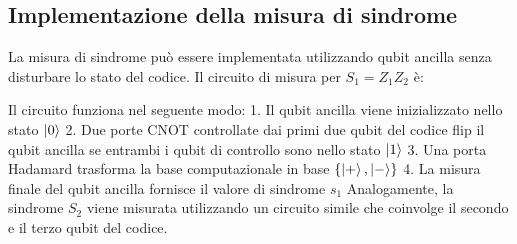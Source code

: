 \documentclass[a4paper,12pt]{report}
\theoremstyle{plain}
\begin{document}
\subsection{Implementazione della misura di sindrome}
La misura di sindrome può essere implementata utilizzando qubit ancilla senza disturbare lo stato del codice. Il circuito di misura per $S_1 = Z_1 Z_2$ è:
\begin{center}
\end{center}
Il circuito funziona nel seguente modo:
1. Il qubit ancilla viene inizializzato nello stato $\ket{0}$
2. Due porte CNOT controllate dai primi due qubit del codice flip il qubit ancilla se entrambi i qubit di controllo sono nello stato $\ket{1}$
3. Una porta Hadamard trasforma la base computazionale in base $\{\ket{+}, \ket{-}\}$
4. La misura finale del qubit ancilla fornisce il valore di sindrome $s_1$
Analogamente, la sindrome $S_2$ viene misurata utilizzando un circuito simile che coinvolge il secondo e il terzo qubit del codice.
\end{document}
